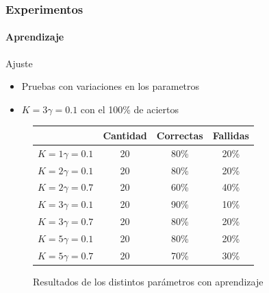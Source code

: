\documentclass{beamer}
\begin{document}
\begin{frame}
  \frametitle{Experimentos}
  \framesubtitle{Aprendizaje}
  \begin{block}{Ajuste}
  \begin{itemize}
  \item Pruebas con variaciones en los parametros
  \item $K = 3   \gamma = 0.1$ con 
  el 100\% de aciertos
	
  \end{itemize}
		\end{block}

\begin{figure}
\centering
\begin{tabular}{|c|c|c|c|}
\hline 
& Cantidad & Correctas & Fallidas \\ 
\hline 
$K = 1  \gamma = 0.1$ & 20 & 80\% & 20\% \\ 
\hline 
$K = 2  \gamma = 0.1$ & 20 & 80\% & 20\% \\ 
\hline 
$K = 2  \gamma = 0.7$ & 20 & 60\% & 40\% \\ 
\hline 
$K = 3  \gamma = 0.1$ & 20 & 90\% & 10\% \\ 
\hline 
$K = 3  \gamma = 0.7$ & 20 & 80\% & 20\% \\ 
\hline 
$K = 5  \gamma = 0.1$ & 20 & 80\% & 20\% \\ 
\hline  
$K = 5  \gamma = 0.7$ & 20 & 70\% & 30\% \\ 
\hline 

\end{tabular} 

\caption{Resultados de los distintos par\'ametros con aprendizaje}
\label{tabla:entramientos}


\end{figure}

\end{frame}
\end{document}

